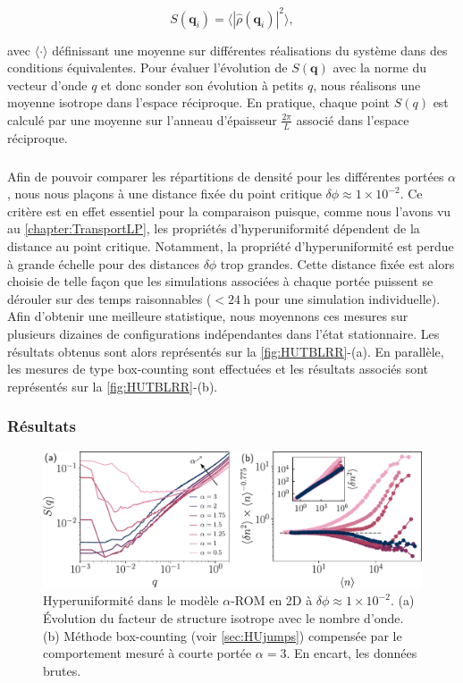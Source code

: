 \begin{equation}
	S(\mathbf{q}_i) = \langle|\hat{\rho}(\mathbf{q}_i)|^2\rangle,
\end{equation}

\noindent avec $\langle \cdot \rangle$ définissant une moyenne sur différentes réalisations du système dans des conditions équivalentes. Pour évaluer l'évolution de $S(\mathbf{q})$ avec la norme du vecteur d'onde $q$ et donc sonder son évolution à petits $q$, nous réalisons une moyenne isotrope dans l'espace réciproque. En pratique, chaque point $S(q)$ est calculé par une moyenne sur l'anneau d'épaisseur $\frac{2\pi}{L}$ associé dans l'espace réciproque.

\subparagraph{}Afin de pouvoir comparer les répartitions de densité pour les différentes portées $\alpha$, nous nous plaçons à une distance fixée du point critique $\delta\phi \approx 1\times 10^{-2}$. Ce critère est en effet essentiel pour la comparaison puisque, comme nous l'avons vu au \autoref{chapter:TransportLP}, les propriétés d'hyperuniformité dépendent de la distance au point critique. Notamment, la propriété d'hyperuniformité est perdue à grande échelle pour des distances $\delta\phi$ trop grandes. Cette distance fixée est alors choisie de telle façon que les simulations associées à chaque portée puissent se dérouler sur des temps raisonnables ($<24~\text{h}$ pour une simulation individuelle). Afin d'obtenir une meilleure statistique, nous moyennons ces mesures sur plusieurs dizaines de configurations indépendantes dans l'état stationnaire. Les résultats obtenus sont alors représentés sur la \autoref{fig:HUTBLRR}-(a). En parallèle, les mesures de type box-counting sont effectuées et les résultats associés sont représentés sur la \autoref{fig:HUTBLRR}-(b).

\subsubsection{Résultats}

\begin{figure}[h]
	\centering
	\includegraphics[width=\textwidth]{Chapitre3/Figures/HU/HUTBLRR.pdf}
	\caption{Hyperuniformité dans le modèle $\alpha$-ROM en 2D à $\delta\phi \approx 1\times 10^{-2}$. (a) Évolution du facteur de structure isotrope avec le nombre d'onde. (b) Méthode box-counting (voir \autoref{sec:HUjumps}) compensée par le comportement mesuré à courte portée $\alpha = 3$. En encart, les données brutes.}
	\label{fig:HUTBLRR}
\end{figure}

